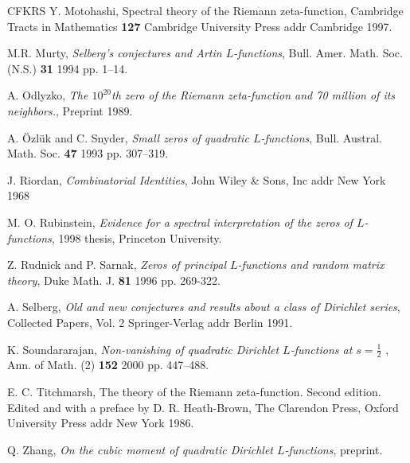 \documentclass[12pt,letterpaper]{amsart}
\theoremstyle{plain}
\theoremstyle{definition}
\theoremstyle{remark}
\numberwithin{equation}{subsection}
\numberwithin{theorem}{subsection}
\numberwithin{table}{subsection}
\begin{document}
\begin{thebibliography}{CFKRS}
\newblock
 Y.  Motohashi,  Spectral theory of the Riemann zeta-function, Cambridge Tracts in Mathematics
 {\bf 127}   Cambridge University Press
 addr Cambridge
  1997.



\newblock
 M.R. Murty,  {\it Selberg's conjectures and Artin $L$-functions},   Bull. Amer. Math. Soc. (N.S.)
 {\bf 31}   1994
 pp. 1--14.



\newblock
 A. Odlyzko,  {\it The $10^{20}$th zero of the Riemann zeta-function and
       70 million of its neighbors.},   Preprint
  1989.



\newblock
 A. \"{O}zl\"{u}k and C. Snyder,  {\it Small zeros of quadratic $L$-functions},   Bull. Austral. Math. Soc.
 {\bf 47}   1993
 pp.  307--319.

\newblock J. Riordan, {\it Combinatorial Identities},   John
Wiley \& Sons, Inc  addr New York   1968

\newblock
 M. O. Rubinstein,  {\it Evidence for a spectral
interpretation of the zeros of $L$-functions},   1998
  thesis, Princeton University.



\newblock
 Z. Rudnick and P. Sarnak,  {\it Zeros of principal $L$-functions and random matrix theory},   Duke Math. J.
 {\bf 81}   1996
 pp. 269-322.



\newblock
 A. Selberg,  {\it  Old and new conjectures and results about a 
class of Dirichlet series},  Collected Papers, Vol. 2
  Springer-Verlag
 addr Berlin
  1991.




\newblock   K. Soundararajan,  {\it Non-vanishing of
quadratic Dirichlet $L$-functions at $s=\frac12$ },    Ann. of Math.
(2)  {\bf 152}   2000  pp. 447--488.




\newblock
 E. C. Titchmarsh,  The theory of the Riemann zeta-function. Second edition. Edited and with a preface by D. R. Heath-Brown,   The Clarendon Press, Oxford University Press
 addr New York
  1986.

\newblock   Q. Zhang,  {\it On the cubic moment of quadratic Dirichlet $L$-functions},
preprint.




\end{thebibliography}
\end{document}
